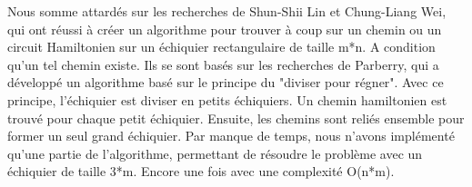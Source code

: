 Nous somme attardés sur les recherches de Shun-Shii Lin et Chung-Liang Wei, qui ont réussi à créer un algorithme pour trouver à coup sur un chemin ou un circuit Hamiltonien sur un échiquier rectangulaire de taille m*n.  A condition qu'un tel chemin existe. Ils se sont basés sur les recherches de Parberry, qui a développé un algorithme basé sur le principe du "diviser pour régner". Avec ce principe, l'échiquier est diviser en petits échiquiers. Un chemin hamiltonien est trouvé pour chaque petit échiquier. Ensuite, les chemins sont reliés ensemble pour former un seul grand échiquier. Par manque de temps, nous n'avons implémenté qu'une partie de l'algorithme, permettant de résoudre le problème avec un échiquier de taille 3*m. Encore une fois avec une complexité O(n*m).

